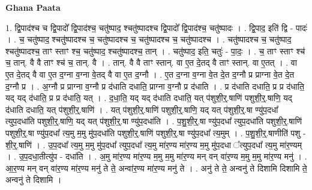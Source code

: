 \documentclass[17pt]{extarticle}
\begin{document}
\textbf{Ghana Paata } \newline

1. द्वि॒पाद॑श्च च द्वि॒पादो᳚ द्वि॒पाद॑श्च॒ चतु॑ष्पाद॒ श्चतु॑ष्पादश्च द्वि॒पादो᳚ द्वि॒पाद॑श्च॒ चतु॑ष्पादः । . द्वि॒पाद॒ इति॑ द्वि - पादः॑ । . च॒ चतु॑ष्पाद॒ श्चतु॑ष्पादश्च च॒ चतु॑ष्पादश्च च॒ चतु॑ष्पादश्च च॒ चतु॑ष्पादश्च । . चतु॑ष्पादश्च च॒ चतु॑ष्पाद॒ श्चतु॑ष्पादश्च॒ ताꣳ स्ताꣳ श्च॒ चतु॑ष्पाद॒ श्चतु॑ष्पादश्च॒ तान् । . चतु॑ष्पाद॒ इति॒ चतुः॑ - पा॒दः॒ । . च॒ ताꣳ स्ताꣳ श्च॑ च॒ तान्. वै वै ताꣳ श्च॑ च॒ तान्. वै । . तान्. वै वै ताꣳ स्तान्. वा ए॒त दे॒तद् वै ताꣳ स्तान्. वा ए॒तत् । . वा ए॒त दे॒तद् वै वा ए॒त द॒ग्ना व॒ग्ना वे॒तद् वै वा ए॒त द॒ग्नौ । . ए॒त द॒ग्ना व॒ग्ना वे॒त दे॒त द॒ग्नौ प्र प्राग्ना वे॒त दे॒त द॒ग्नौ प्र । . अ॒ग्नौ प्र प्राग्ना व॒ग्नौ प्र द॑धाति दधाति॒ प्राग्ना व॒ग्नौ प्र द॑धाति । . प्र द॑धाति दधाति॒ प्र प्र द॑धाति॒ यद् यद् द॑धाति॒ प्र प्र द॑धाति॒ यत् । . द॒धा॒ति॒ यद् यद् द॑धाति दधाति॒ यत् प॑शुशी॒र्॒.षाणि॑ पशुशी॒र्॒.षाणि॒ यद् द॑धाति दधाति॒ यत् प॑शुशी॒र्॒.षाणि॑ । . यत् प॑शुशी॒र्॒.षाणि॑ पशुशी॒र्॒.षाणि॒ यद् यत् प॑शुशी॒र्॒.षा ण्यु॑प॒दधा᳚ त्युप॒दधा॑ति पशुशी॒र्॒.षाणि॒ यद् यत् प॑शुशी॒र्॒.षा ण्यु॑प॒दधा॑ति । . प॒शु॒शी॒र्॒.षा ण्यु॑प॒दधा᳚ त्युप॒दधा॑ति पशुशी॒र्॒.षाणि॑ पशुशी॒र्॒.षा ण्यु॑प॒दधा᳚ त्य॒मु म॒मु मु॑प॒दधा॑ति पशुशी॒र्॒.षाणि॑ पशुशी॒र्॒.षा ण्यु॑प॒दधा᳚ त्य॒मुम् । . प॒शु॒शी॒र्॒.षाणीति॑ पशु - शी॒र्॒.षाणि॑ । . उ॒प॒दधा᳚ त्य॒मु म॒मु मु॑प॒दधा᳚ त्युप॒दधा᳚ त्य॒मु मा॑र॒ण्य मा॑र॒ण्य म॒मु मु॑प॒दधा ᳚त्युप॒दधा᳚ त्य॒मु मा॑र॒ण्यम् । . उ॒प॒दधा॒तीत्यु॑प - दधा॑ति । . अ॒मु मा॑र॒ण्य मा॑र॒ण्य म॒मु म॒मु मा॑र॒ण्य मन् वन् वा॑र॒ण्य म॒मु म॒मु मा॑र॒ण्य मनु॑ । . आ॒र॒ण्य मन् वन् वा॑र॒ण्य मा॑र॒ण्य मनु॑ ते ते॒ अन्वा॑र॒ण्य मा॑र॒ण्य मनु॑ ते । . अनु॑ ते ते॒ अन्वनु॑ ते दिशामि दिशामि ते॒ अन्वनु॑ ते दिशामि । \newline
\end{document}
